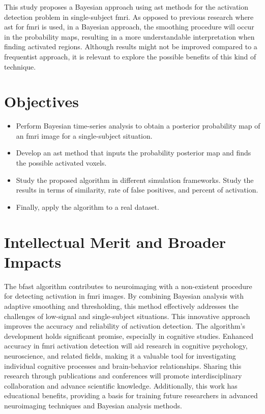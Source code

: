 This study proposes a Bayesian approach using \gls{ast} methods for the 
activation detection problem in single-subject \gls{fmri}. As opposed to 
previous research where \gls{ast} for \gls{fmri} is used, in a Bayesian 
approach, the smoothing procedure will occur in the probability maps, 
resulting in a more understandable interpretation when finding activated 
regions. Although results might not be improved compared to a frequentist 
approach, it is relevant to explore the possible benefits of this kind of 
technique. 

\section{Objectives}

\begin{itemize}
\item Perform Bayesian time-series analysis to obtain a posterior probability 
map of an \gls{fmri} image for a single-subject situation.
\item Develop an \gls{ast} method that inputs the probability posterior map 
and finds the possible activated voxels.
\item Study the proposed algorithm in different simulation frameworks. Study 
the results in terms of similarity, rate of false positives, and percent of 
activation.
\item Finally, apply the algorithm to a real dataset.
\end{itemize}

\section{Intellectual Merit and Broader Impacts}

The \gls{bfast} algorithm contributes to neuroimaging with a non-existent procedure for 
detecting activation in \gls{fmri} images. By combining Bayesian analysis with 
adaptive smoothing and thresholding, this method effectively addresses the 
challenges of low-signal and single-subject situations. This innovative 
approach improves the accuracy and reliability of activation detection. 
The algorithm's development holds significant promise, especially in 
cognitive studies. Enhanced accuracy in \gls{fmri} activation detection will 
aid research in cognitive psychology, neuroscience, and related fields, 
making it a valuable tool for investigating individual cognitive processes 
and brain-behavior relationships. Sharing this research through publications 
and conferences will promote interdisciplinary collaboration and advance 
scientific knowledge. Additionally, this work has educational benefits, 
providing a basis for training future researchers in advanced neuroimaging 
techniques and Bayesian analysis methods.


